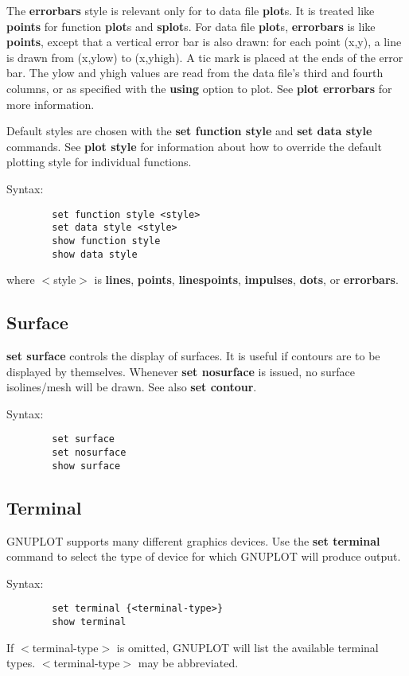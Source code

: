 The {\bf errorbars} style is relevant only for to data file {\bf plot}s. It is
treated like {\bf points} for function {\bf plot}s and {\bf splot}s. For data file
{\bf plot}s, {\bf errorbars} is like {\bf points}, except that a vertical error
bar is also drawn: for each point (x,y), a line is drawn from (x,ylow)
to (x,yhigh). A tic mark is placed at the ends of the error bar. The
ylow and yhigh values are read from the data file's third and fourth
columns, or as specified with the {\bf using} option to plot.  See {\bf plot
errorbars} for more information.

Default styles are chosen with the {\bf set function style} and {\bf set
data style} commands. See {\bf plot style} for information about how
to override the default plotting style for individual functions.

Syntax:
\begin{verbatim}
        set function style <style>
        set data style <style>
        show function style
        show data style
\end{verbatim}

where $<$style$>$ is {\bf lines}, {\bf points}, {\bf linespoints}, {\bf impulses},
{\bf dots}, or {\bf errorbars}.
\subsection{Surface}
{\bf set surface} controls the display of surfaces. It is useful if
contours are to be displayed by themselves. Whenever {\bf set nosurface}
is issued, no surface isolines/mesh will be drawn. See also {\bf set
contour}.

Syntax:
\begin{verbatim}
        set surface
        set nosurface
        show surface
\end{verbatim}
\subsection{Terminal}
GNUPLOT supports many different graphics devices. Use the {\bf set
terminal} command to select the type of device for which GNUPLOT
will produce output.

Syntax:
\begin{verbatim}
        set terminal {<terminal-type>}
        show terminal
\end{verbatim}

If $<$terminal-type$>$ is omitted, GNUPLOT will list the available
terminal types. $<$terminal-type$>$ may be abbreviated.

